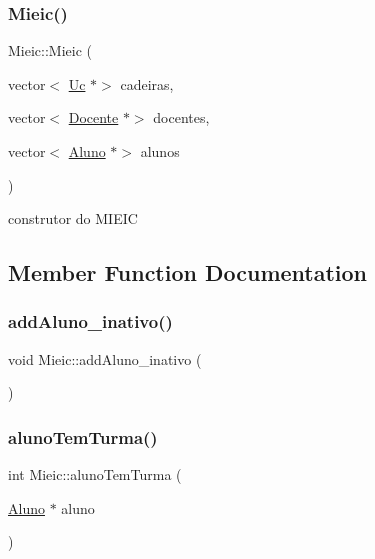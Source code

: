 \subsubsection{\texorpdfstring{Mieic()}{Mieic()}}
{\footnotesize\ttfamily Mieic\+::\+Mieic (\begin{DoxyParamCaption}\item[{vector$<$ \hyperlink{class_uc}{Uc} $\ast$$>$}]{cadeiras,  }\item[{vector$<$ \hyperlink{class_docente}{Docente} $\ast$$>$}]{docentes,  }\item[{vector$<$ \hyperlink{class_aluno}{Aluno} $\ast$$>$}]{alunos }\end{DoxyParamCaption})}

construtor do M\+I\+E\+IC 

\subsection{Member Function Documentation}
\hypertarget{class_mieic_a66aaefa0f9fa891046c3d9429cf700f0}{}\label{class_mieic_a66aaefa0f9fa891046c3d9429cf700f0} 
\subsubsection{\texorpdfstring{add\+Aluno\+\_\+inativo()}{addAluno\_inativo()}}
{\footnotesize\ttfamily void Mieic\+::add\+Aluno\+\_\+inativo (\begin{DoxyParamCaption}{ }\end{DoxyParamCaption})}

\hypertarget{class_mieic_ad51b450054f0b07069a40c1d1b0235b0}{}\label{class_mieic_ad51b450054f0b07069a40c1d1b0235b0} 
\subsubsection{\texorpdfstring{aluno\+Tem\+Turma()}{alunoTemTurma()}}
{\footnotesize\ttfamily int Mieic\+::aluno\+Tem\+Turma (\begin{DoxyParamCaption}\item[{\hyperlink{class_aluno}{Aluno} $\ast$}]{aluno }\end{DoxyParamCaption})}

\hypertarget{class_mieic_a9b02affd45121b5898e17094d36a4337}{}\label{class_mieic_a9b02affd45121b5898e17094d36a4337} 
